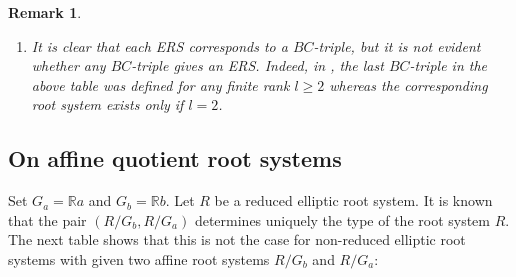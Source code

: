 \documentclass[11pt]{amsart}
\newcommand{\R}{\mathbb{R}}
\newcommand{\Z}{\mathbb{Z}}
\newtheorem{rem}[thm]{Remark}%
\newcommand{\rad}{\operatorname{rad}}
\begin{document}
\begin{rem}
\begin{enumerate}
\begin{center}
{\begin{tabular}{|c||c|}
$(\Lambda, 2\Lambda, 2S(0,\tilde{\sigma_1}, \tilde{\sigma_2}))$ & $C^\vee C_l^{(2)\ast_l}$\\ \hline
$(S(0,\tilde{\sigma_1}, \tilde{\sigma_2}), 2\Lambda, 2S(0,\tilde{\sigma_1}, \tilde{\sigma_2}))$ & $C^\vee C_l^{(2)\ast_0}$\\ \hline
$(S(0,\tilde{\sigma_1}, \tilde{\sigma_2}), 2\Lambda, 2S(0,\tilde{\sigma_1}, \tilde{\sigma_2})+2\sigma_1)$ & $C^\vee C_l^{(2)\ast_1}$ and $C^\vee C_l^{(2)\ast_{1'}}$\\ \hline
$(\Lambda, S(0,\tilde{\sigma_1}, \tilde{\sigma_2}),2\Lambda)$ & $BB_2^{\vee (2)\ast}$ \\ \hline
\end{tabular}}
\end{center}
\vskip 0.1in
Here, a $BC$-triple is a triple $(S,L,E)$ consisting of subsets of $\Lambda:=\rad_{\Z}(I)=\Z a\oplus \Z b$ which corresponds to the root system $R=(R(BC_l)_s+S) \cup (R(BC_l)_m+L) \cup (R(BC_l)_l+E)$.\footnote{For these admitted rank $1$ case, it suffices to think of the pair $(S,E)$, called $BC$-pair.}  \\
\item It is clear that each ERS corresponds to a $BC$-triple, but it is not evident whether any $BC$-triple gives an ERS. Indeed, in \cite{AzamKhaliliYousofzadeh2005}, the last $BC$-triple in the above table was defined for any finite rank $l \geq 2$ whereas the corresponding root system exists only if $l=2$. 
\end{enumerate}
\end{rem}
\newpage
\subsection{On affine quotient root systems}\label{sect_two-affine-quot}

Set $G_a=\R a$ and $G_b=\R b$. Let $R$ be a reduced elliptic root system. It is known that the pair $(R/G_b, R/G_a)$ determines uniquely the type of the root system $R$. 
The next table shows that this is not the case for non-reduced elliptic root systems
with given two affine root systems $R/G_b$ and $R/G_a$: \\
\end{document}
